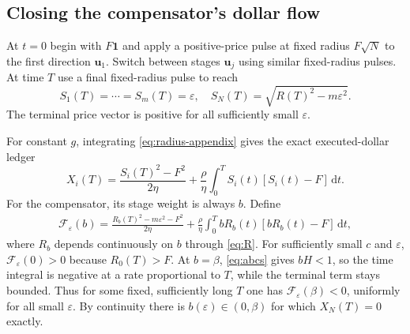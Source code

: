 \documentclass[11pt]{article}
\numberwithin{equation}{section}
\theoremstyle{definition}
\theoremstyle{remark}
\newcommand{\dd}{\,\mathrm{d}}
\newcommand{\one}{\mathbf{1}}
\begin{document}
\subsection{Closing the compensator's dollar flow}
At $t=0$ begin with $F\one$ and apply a positive-price pulse at fixed radius $F\sqrt N$ to the first direction $\bm u_1$. Switch between stages $\bm u_j$ using similar fixed-radius pulses. At time $T$ use a final fixed-radius pulse to reach
\begin{equation}\label{eq:endpoint-severe}
S_1(T)=\cdots=S_m(T)=\varepsilon,
\quad S_N(T)=\sqrt{R(T)^2-m\varepsilon^2}.
\end{equation}
The terminal price vector is positive for all sufficiently small $\varepsilon$.

For constant $g$, integrating \eqref{eq:radius-appendix} gives the exact executed-dollar ledger
\begin{equation}\label{eq:Xledger}
X_i(T)=\frac{S_i(T)^2-F^2}{2\eta}
+\frac\rho\eta\int_0^T S_i(t)[S_i(t)-F]\dd t.
\end{equation}
For the compensator, its stage weight is always $b$. Define
\begin{align}\label{eq:compensator}
\mathcal F_\varepsilon(b)=\frac{R_b(T)^2-m\varepsilon^2-F^2}{2\eta}
+\frac\rho\eta\int_0^T bR_b(t)[bR_b(t)-F]\dd t,
\end{align}
where $R_b$ depends continuously on $b$ through \eqref{eq:R}. For sufficiently small $c$ and $\varepsilon$, $\mathcal F_\varepsilon(0)>0$ because $R_0(T)>F$. At $b=\beta$, \eqref{eq:abcs} gives $bH<1$, so the time integral is negative at a rate proportional to $T$, while the terminal term stays bounded. Thus for some fixed, sufficiently long $T$ one has $\mathcal F_\varepsilon(\beta)<0$, uniformly for all small $\varepsilon$. By continuity there is $b(\varepsilon)\in(0,\beta)$ for which $X_N(T)=0$ exactly.
\end{document}
